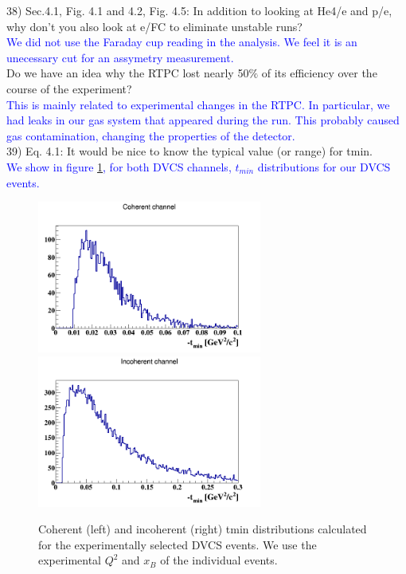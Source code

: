 38) Sec.4.1, Fig. 4.1 and 4.2, Fig. 4.5: In addition to looking at He4/e and 
p/e, why don't you also look at e/FC to eliminate unstable runs?\\
\textcolor{blue}{We did not use the Faraday cup reading in the analysis. We
feel it is an unecessary cut for an assymetry measurement.}\\

Do we have an idea why the RTPC lost nearly 50$\%$ of its efficiency over the 
course of the experiment?\\
\textcolor{blue}{
 This is mainly related to experimental changes in the RTPC. In particular, we 
had leaks in our gas system that appeared during the run. This probably
caused gas contamination, changing the properties of the detector.}\\


39) Eq. 4.1: It would be nice to know the typical value (or range) for tmin.\\
\textcolor{blue}{We show in figure \ref{fig:tmin_both}, for both DVCS 
channels, $t_{min}$ distributions for our DVCS events.}\\

\begin{figure}[tbp]
\includegraphics[height=5.0cm]{fig/tmin_coh.png}
\includegraphics[height=5.0cm]{fig/tmin_incoh.png}
\caption{Coherent (left) and incoherent (right) tmin distributions calculated 
for the experimentally selected DVCS events. We use the experimental $Q^{2}$ 
and $x_{B}$ of the individual events. }
\label{fig:tmin_both}
 \end{figure}


